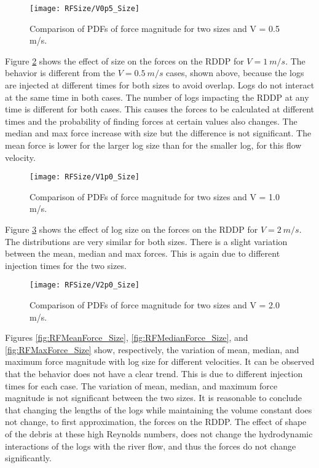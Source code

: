 \begin{figure}[H]
\centering
\texttt{[image: RFSize/V0p5\_Size]}
\caption{\label{fig:RFSV0p5}Comparison of PDFs of force magnitude for two sizes and V = 0.5 m/s.}
\end{figure} 

\noindent Figure \ref{fig:RFSV1p0} shows the effect of size on the forces on the RDDP for $V = 1~m/s$. The behavior is different from the $V = 0.5~m/s$ cases, shown above, because the logs are injected at different times for both sizes to avoid overlap. Logs do not interact at the same time in both cases. The number of logs impacting the RDDP at any time is different for both cases. This causes the forces to be calculated at different times and the probability of finding forces at certain values also changes. The median and max force increase with size but the difference is not significant. The mean force is lower for the larger log size than for the smaller log, for this flow velocity. 

\begin{figure}
\centering
\texttt{[image: RFSize/V1p0\_Size]}
\caption{\label{fig:RFSV1p0}Comparison of PDFs of force magnitude for two sizes and V = 1.0 m/s.}
\end{figure} 

\noindent Figure \ref{fig:RFSV2p0} shows the effect of log size on the forces on the RDDP for $V = 2~m/s$. The distributions are very similar for both sizes. There is a slight variation between the mean, median and max forces. This is again due to different injection times for the two sizes. 

\begin{figure}
\centering
\texttt{[image: RFSize/V2p0\_Size]}
\caption{\label{fig:RFSV2p0}Comparison of PDFs of force magnitude for two sizes and V = 2.0 m/s.}
\end{figure} 

\noindent Figures \ref{fig:RFMeanForce_Size}, \ref{fig:RFMedianForce_Size}, and \ref{fig:RFMaxForce_Size} show, respectively, the variation of mean, median, and maximum force magnitude with log size for different velocities. It can be observed that the behavior does not have a clear trend. This is due to different injection times for each case. The variation of mean, median, and maximum force magnitude is not significant between the two sizes. It is reasonable to conclude that changing the lengths of the logs while maintaining the volume constant does not change, to first approximation, the forces on the RDDP. The effect of shape of the debris at these high Reynolds numbers, does not change the hydrodynamic interactions of the logs with the river flow, and thus the forces do not change significantly.

